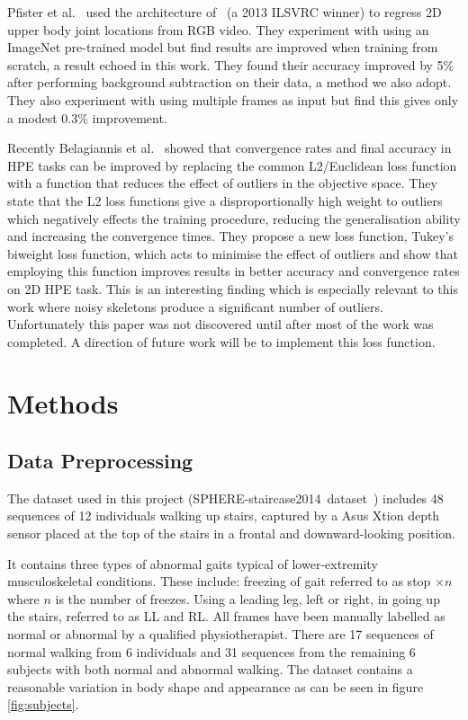 \documentclass[11pt]{article} %
\begin{document}
Pfister et al.~\cite{Pfister} used the architecture of~\cite{Sermanet2013a} (a 2013 ILSVRC winner) to regress 2D upper body joint locations from RGB video. They experiment with using an ImageNet pre-trained model but find results are improved when training from scratch, a result echoed in this work. They found their accuracy improved by 5\% after performing background subtraction on their data, a method we also adopt. They also experiment with using multiple frames as input but find this gives only a modest 0.3\% improvement. 


Recently Belagiannis et al.~\cite{Belagiannis} showed that convergence rates and final accuracy in HPE tasks can be improved by replacing the common L2/Euclidean loss function with a function that reduces the effect of outliers in the objective space. They state that the L2 loss functions give a disproportionally high weight to outliers which negatively effects the training procedure, reducing the generalisation ability and increasing the convergence times. They propose a new loss function, Tukey's biweight loss function, which acts to minimise the effect of outliers and show that employing this function improves results in better accuracy and convergence rates on 2D HPE task. This is an interesting finding which is especially relevant to this work where noisy skeletons produce a significant number of outliers. Unfortunately this paper was not discovered until after most of the work was completed. A direction of future work will be to implement this loss function.






\section{Methods}

\subsection{Data Preprocessing}
\label{sec:preprocessing}

The dataset used in this project (SPHERE-staircase2014~dataset~\cite{Paiement}) includes 48 sequences of 12 individuals walking up stairs, captured by a Asus Xtion depth sensor placed at the top of the stairs in a frontal and downward-looking position.

It contains three types of abnormal gaits typical of lower-extremity musculoskeletal conditions. These include: freezing of gait referred to as stop $\times n$ where $n$ is the number of freezes. Using a leading leg, left or right, in going up the stairs, referred to as LL and RL. All frames have been manually labelled as normal or abnormal by a qualified physiotherapist. There are 17 sequences of normal walking from 6 individuals and 31 sequences from the remaining 6 subjects with both normal and abnormal walking. The dataset contains a reasonable variation in body shape and appearance as can be seen in figure \ref{fig:subjects}.
\end{document}
